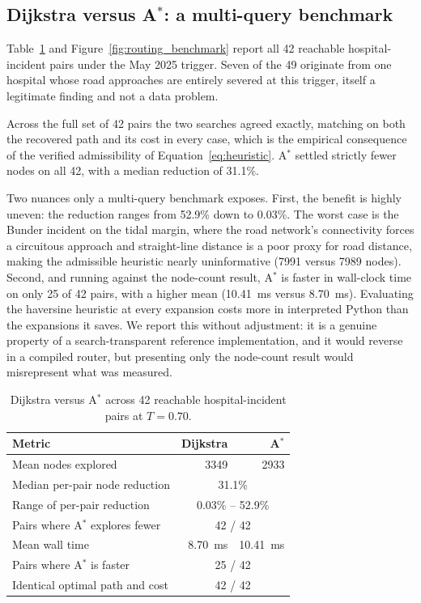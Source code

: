 \documentclass[journal]{IEEEtran}
\begin{document}
\subsection{Dijkstra versus A$^\ast$: a multi-query benchmark}
\label{sec:res-algo}

Table~\ref{tab:algo} and Figure~\ref{fig:routing_benchmark} report all 42
reachable hospital-incident pairs under the May 2025 trigger. Seven of the 49
originate from one hospital whose road approaches are entirely severed at this
trigger, itself a legitimate finding and not a data problem.

Across the full set of 42 pairs the two searches agreed exactly, matching on both
the recovered path and its cost in every case, which is the empirical consequence
of the verified admissibility of Equation~\eqref{eq:heuristic}. A$^\ast$ settled
strictly fewer nodes on all 42, with a median reduction of 31.1\%.

Two nuances only a multi-query benchmark exposes. First, the benefit is highly
uneven: the reduction ranges from 52.9\% down to 0.03\%. The worst case is the
Bunder incident on the tidal margin, where the road network's connectivity forces
a circuitous approach and straight-line distance is a poor proxy for road
distance, making the admissible heuristic nearly uninformative (\num{7991} versus
\num{7989} nodes). Second, and running against the node-count result, A$^\ast$ is
faster in wall-clock time on only 25 of 42 pairs, with a higher mean
(\SI{10.41}{\milli\second} versus \SI{8.70}{\milli\second}). Evaluating the
haversine heuristic at every expansion costs more in interpreted Python than the
expansions it saves. We report this without adjustment: it is a genuine property
of a search-transparent reference implementation, and it would reverse in a
compiled router, but presenting only the node-count result would misrepresent
what was measured.

\begin{table}[!t]
\centering\footnotesize
\caption{Dijkstra versus A$^\ast$ across 42 reachable hospital-incident pairs at
$T=0.70$.}
\label{tab:algo}
\small
\begin{tabular}{@{}lrr@{}}
\toprule
\textbf{Metric} & \textbf{Dijkstra} & \textbf{A}$^\ast$ \\
\midrule
Mean nodes explored & \num{3349} & \num{2933} \\
Median per-pair node reduction & \multicolumn{2}{c}{31.1\%} \\
Range of per-pair reduction & \multicolumn{2}{c}{0.03\% -- 52.9\%} \\
Pairs where A$^\ast$ explores fewer & \multicolumn{2}{c}{42 / 42} \\
Mean wall time & \SI{8.70}{\milli\second} & \SI{10.41}{\milli\second} \\
Pairs where A$^\ast$ is faster & \multicolumn{2}{c}{25 / 42} \\
Identical optimal path and cost & \multicolumn{2}{c}{42 / 42} \\
\bottomrule
\end{tabular}
\end{table}
\end{document}
